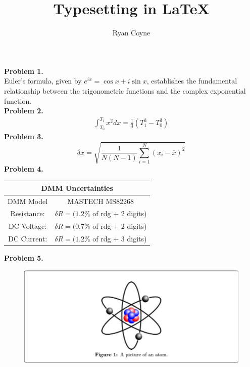 \documentclass[12pt]{article}
\begin{document}
    \title{Typesetting in \LaTeX}
    \author{Ryan Coyne}
    \date{}
    \maketitle
    \noindent\textbf{Problem 1.}\\
    Euler's formula, given by \(e^{ix}=\cos x + i\sin x\), establishes the fundamental relationship between the trigonometric functions and the complex exponential function.\\
    \textbf{Problem 2.}
    \begin{align*}
        \int_{T_0}^{T_1} x^2 dx = \frac{1}{3}(T_1^3-T_0^3)
    \end{align*}
    \textbf{Problem 3.}
    \begin{equation}
        \delta x=\sqrt{\frac{1}{N(N-1)}\sum_{i=1}^N(x_i-\overline{x})^2}
    \end{equation}
    \textbf{Problem 4.}
    \begin{table}[H]
        \centering
        \begin{tabular}{|c|c|}
            \hline
            \multicolumn{2}{|c|}{DMM Uncertainties}\\
            \hline
            DMM Model & MASTECH MS82268\\
            \hline
            Resistance: &\(\delta R=(1.2\%\) of rdg + 2 digits)\\
            \hline
            DC Voltage: & \(\delta R= (0.7\% \) of rdg + 2 digits)\\
            \hline
            DC Current: & \(\delta R= (1.2\% \) of rdg + 3 digits)\\
            \hline
        \end{tabular}
    \end{table}
    \textbf{Problem 5.}
    \begin{figure}[H]
        \centering
        \includegraphics[width=0.8\linewidth]{atom.png}
    \end{figure}
\end{document}
